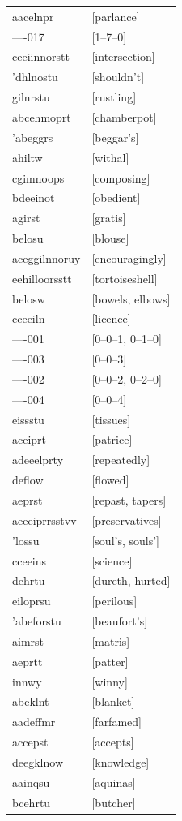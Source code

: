\documentclass{article}
\begin{document}
\begin{tabular}{ll}
aacelnpr & [parlance] \\
----017 & [1--7--0] \\
ceeiinnorstt & [intersection] \\
'dhlnostu & [shouldn't] \\
gilnrstu & [rustling] \\
abcehmoprt & [chamberpot] \\
'abeggrs & [beggar's] \\
ahiltw & [withal] \\
cgimnoops & [composing] \\
bdeeinot & [obedient] \\
agirst & [gratis] \\
belosu & [blouse] \\
aceggilnnoruy & [encouragingly] \\
eehilloorsstt & [tortoiseshell] \\
belosw & [bowels, elbows] \\
cceeiln & [licence] \\
----001 & [0--0--1, 0--1--0] \\
----003 & [0--0--3] \\
----002 & [0--0--2, 0--2--0] \\
----004 & [0--0--4] \\
eissstu & [tissues] \\
aceiprt & [patrice] \\
adeeelprty & [repeatedly] \\
deflow & [flowed] \\
aeprst & [repast, tapers] \\
aeeeiprrsstvv & [preservatives] \\
'lossu & [soul's, souls'] \\
cceeins & [science] \\
dehrtu & [dureth, hurted] \\
eiloprsu & [perilous] \\
'abeforstu & [beaufort's] \\
aimrst & [matris] \\
aeprtt & [patter] \\
innwy & [winny] \\
abeklnt & [blanket] \\
aadeffmr & [farfamed] \\
accepst & [accepts] \\
deegklnow & [knowledge] \\
aainqsu & [aquinas] \\
bcehrtu & [butcher] \\

\end{tabular}
\end{document}
